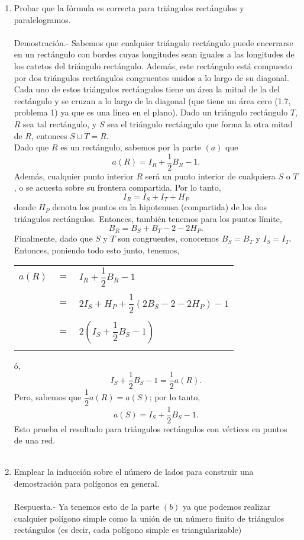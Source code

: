 \begin{enumerate}[ \bfseries 1.]
\begin{enumerate}[\bfseries (a)]
		\item Probar que la fórmula es correcta para triángulos rectángulos y paralelogramos.\\\\
		Demostración.-\; Sabemos que cualquier triángulo rectángulo puede encerrarse en un rectángulo con bordes cuyas longitudes sean iguales a las longitudes de los catetos del triángulo rectángulo. Además, este rectángulo está compuesto por dos triángulos rectángulos congruentes unidos a lo largo de su diagonal. Cada uno de estos triángulos rectángulos tiene un área la mitad de la del rectángulo y se cruzan a lo largo de la diagonal (que tiene un área cero (1.7, problema 1) ya que es una línea en el plano). Dado un triángulo rectángulo $T$, $R$ sea tal rectángulo, y $S$ sea el triángulo rectángulo que forma la otra mitad de $R$, entonces $S\cup T = R$.\\ 
		Dado que $R$ es un rectángulo, sabemos por la parte $(a)$ que $$a(R)=I_R + \dfrac{1}{2} B_R-1.$$
		Además, cualquier punto interior $R$ será un punto interior de cualquiera $S$ o $T$, o se acuesta sobre su frontera compartida. Por lo tanto, $$I_R = I_S + I_T + H_P$$ donde $H_P$ denota los puntos en la hipotenusa (compartida) de los dos triángulos rectángulos. Entonces, también tenemos para los puntos límite, $$B_R = B_S + B_T - 2 - 2H_P. $$  Finalmente, dado que $S$ y $T$ son congruentes, conocemos $B_S = B_T$ y $I_S = I_T.$ Entonces, poniendo todo esto junto, tenemos,
		\begin{center}	    
		    \begin{tabular}{rcl}
			$a(R)$ & $=$ & $I_R + \dfrac{1}{2} B_R -1$ \\\\
			& $=$ & $2I_S + H_P + \dfrac{1}{2} (2B_S - 2 - 2H_P) - 1 $ \\\\ 
			& $=$ & $2 (I_S + \dfrac{1}{2} B_S - 1)$\\\\
		    \end{tabular}
		\end{center}
		ó, $$I_S + \dfrac{1}{2} B_S - 1 = \dfrac{1}{2} a(R).$$
		Pero, sabemos que $\dfrac{1}{2} a(R) = a (S)$; por lo tanto, $$a(S)= I_S + \dfrac{1}{2} B_S -1.$$
		Esto prueba el resultado para triángulos rectángulos con vértices en puntos de una red.\\\\

		\item Emplear la inducción sobre el número de lados para construir una demostración para polígonos en general.\\\\
		Respuesta.-\; Ya tenemos esto de la parte $(b)$ ya que podemos realizar cualquier polígono simple como la unión de un número finito de triángulos rectángulos (es decir, cada polígono simple es triangularizable)\\\\


\end{enumerate}
\end{enumerate}
